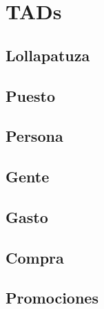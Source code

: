 \documentclass[10pt, a4paper]{article}
\begin{document}
\section{TADs}{
    \subsection{Lollapatuza}
    
    \newpage

    \subsection{Puesto}
    
    \newpage

    \subsection{Persona}
    
    \newpage

    \subsection{Gente}
    
    \newpage

    \subsection{Gasto}
    
    \newpage

    \subsection{Compra}
    
    \newpage
    
    \subsection{Promociones}
    
}
    
\end{document}

